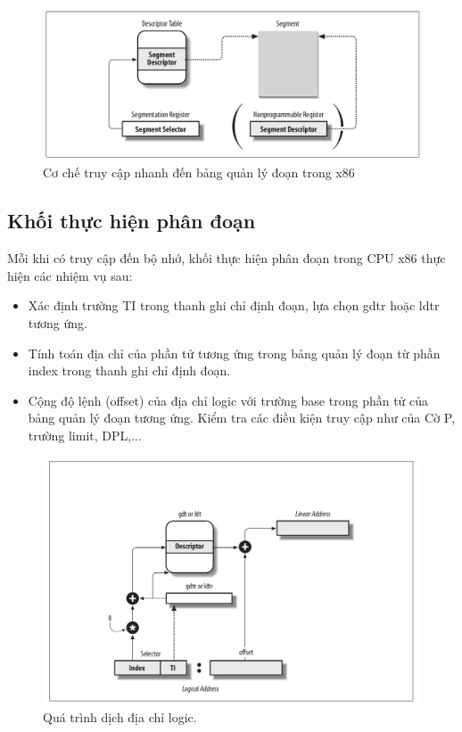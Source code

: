 \documentclass[12pt]{report}
\begin{document}
\begin{figure}[h]
\centering
\caption{Cơ chế truy cập nhanh đến bảng quản lý đoạn trong x86}
\includegraphics[width=\textwidth]{fast_access_gdt.png}
\end{figure}



\subsection{Khối thực hiện phân đoạn}
Mỗi khi có truy cập đến bộ nhớ, khối thực hiện phân đoạn trong CPU x86 thực hiện các nhiệm vụ sau: 
\begin{itemize}
\item Xác định trường TI trong thanh ghi chỉ định đoạn, lựa chọn gdtr hoặc ldtr tương ứng. 
\item Tính toán địa chỉ của phần tử tương ứng trong bảng quản lý đoạn từ phần index trong thanh ghi chỉ định đoạn. 
\item Cộng độ lệnh (offset) của địa chỉ logic với trường base trong phần tử của bảng quản lý đoạn tương ứng. Kiểm tra các điều kiện truy cập như của Cờ P, trường limit, DPL,...
\end{itemize}

\begin{figure}[h]
\centering
\caption{Quá trình dịch địa chỉ logic.}
\includegraphics[width=\textwidth]{logic_translate.png}
\end{figure}
\end{document}
